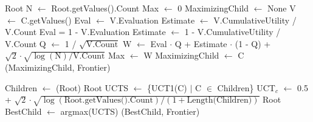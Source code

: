 \begin{algorithm}[H]
    \begin{algorithmic}[1]
                \State \Return Root
            \EndIf
            \State N $\gets$ Root.getValues().Count
            \State Max $\gets$ 0
            \State MaximizingChild $\gets$ None
                \State V $\gets$ C.getValues()
                    \State Eval $\gets$ V.Evaluation
                    \State Estimate $\gets$ V.CumulativeUtility / V.Count
                \Else 
                    \State Eval = 1 - V.Evaluation
                    \State Estimate $\gets$ 1 - V.CumulativeUtility / V.Count
                \EndIf
                \State Q $\gets$ 1 / $\sqrt{\text{V.Count}}$
                \State W $\gets$ Eval $\cdot$ Q + Estimate $\cdot$ (1 - Q) + $\sqrt{2}\cdot\sqrt{\log(\text{N}) / \text{V.Count}}$
                    \State Max $\gets$ W
                    \State MaximizingChild $\gets$ C
                \EndIf
            \EndFor 
            \State \Return {}(MaximizingChild, Frontier)
        \EndProcedure
    \end{algorithmic}    
\end{algorithm}

\begin{algorithm}[H]
    \begin{algorithmic}[1]
            \State Children $\gets$ (Root)
                \State \Return Root
            \EndIf
            \State UCTS $\gets$ \{UCT1(C) $|$ C $\in$ Children\}
            \State UCT$_c$ $\gets$ 0.5 + $\sqrt{2} \cdot \sqrt{\log(\text{Root.getValues().Count}) / (1+\text{Length(Children)})}$
                \State \Return Root
            \Else
                \State BestChild $\gets$ argmax(UCTS)
                \State \Return {}(BestChild, Frontier)
            \EndIf 
        \EndProcedure
    \end{algorithmic}    
\end{algorithm}

\newpage
